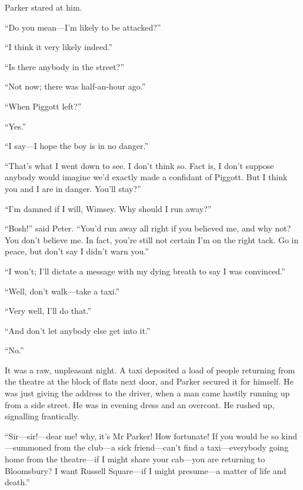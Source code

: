 Parker stared at him.

\enquote{Do you mean\allowbreak---\allowbreak I’m likely to be attacked?}

\enquote{I think it very likely indeed.}

\enquote{Is there anybody in the street?}

\enquote{Not now; there was half-an-hour ago.}

\enquote{When Piggott left?}

\enquote{Yes.}

\enquote{I say\allowbreak---\allowbreak I hope the boy is in no danger.}

\enquote{That’s what I went down to see. I don’t think so. Fact is, I don’t suppose anybody would imagine we’d exactly made a confidant of Piggott. But I think you and I are in danger. You’ll stay?}

\enquote{I’m damned if I will, Wimsey. Why should I run away?}

\enquote{Bosh!} said Peter. \enquote{You’d run away all right if you believed me, and why not? You don’t believe me. In fact, you’re still not certain I’m on the right tack. Go in peace, but don’t say I didn’t warn you.}

\enquote{I won’t; I’ll dictate a message with my dying breath to say I was convinced.}

\enquote{Well, don’t walk\allowbreak---\allowbreak take a taxi.}

\enquote{Very well, I’ll do that.}

\enquote{And don’t let anybody else get into it.}

\enquote{No.}

It was a raw, unpleasant night. A taxi deposited a load of people returning from the theatre at the block of flats next door, and Parker secured it for himself. He was just giving the address to the driver, when a man came hastily running up from a side street. He was in evening dress and an overcoat. He rushed up, signalling frantically.

\enquote{Sir\allowbreak---\allowbreak sir!---dear me! why, it’s Mr Parker! How fortunate! If you would be so kind\allowbreak---\allowbreak summoned from the club\allowbreak---\allowbreak a sick friend\allowbreak---\allowbreak can’t find a taxi\allowbreak---\allowbreak everybody going home from the theatre\allowbreak---\allowbreak if I might share your cab\allowbreak---\allowbreak you are returning to Bloomsbury? I want Russell Square\allowbreak---\allowbreak if I might presume\allowbreak---\allowbreak a matter of life and death.}

